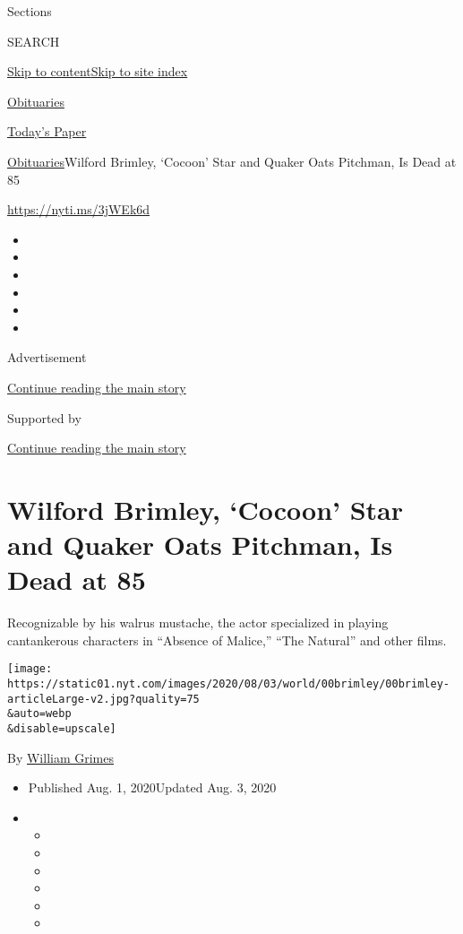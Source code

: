 Sections

SEARCH

\protect\hyperlink{site-content}{Skip to
content}\protect\hyperlink{site-index}{Skip to site index}

\href{https://www.nytimes.com/section/obituaries}{Obituaries}

\href{https://myaccount.nytimes.com/auth/login?response_type=cookie\&client_id=vi}{}

\href{https://www.nytimes.com/section/todayspaper}{Today's Paper}

\href{/section/obituaries}{Obituaries}\textbar{}Wilford Brimley,
`Cocoon' Star and Quaker Oats Pitchman, Is Dead at 85

\url{https://nyti.ms/3jWEk6d}

\begin{itemize}
\item
\item
\item
\item
\item
\item
\end{itemize}

Advertisement

\protect\hyperlink{after-top}{Continue reading the main story}

Supported by

\protect\hyperlink{after-sponsor}{Continue reading the main story}

\hypertarget{wilford-brimley-cocoon-star-and-quaker-oats-pitchman-is-dead-at-85}{%
\section{Wilford Brimley, `Cocoon' Star and Quaker Oats Pitchman, Is
Dead at
85}\label{wilford-brimley-cocoon-star-and-quaker-oats-pitchman-is-dead-at-85}}

Recognizable by his walrus mustache, the actor specialized in playing
cantankerous characters in ``Absence of Malice,'' ``The Natural'' and
other films.

\texttt{[image: https://static01.nyt.com/images/2020/08/03/world/00brimley/00brimley-articleLarge-v2.jpg?quality=75\\\&auto=webp\\\&disable=upscale]}

By \href{https://www.nytimes.com/by/william-grimes}{William Grimes}

\begin{itemize}
\item
  Published Aug. 1, 2020Updated Aug. 3, 2020
\item
  \begin{itemize}
  \item
  \item
  \item
  \item
  \item
  \item
  \end{itemize}
\end{itemize}

